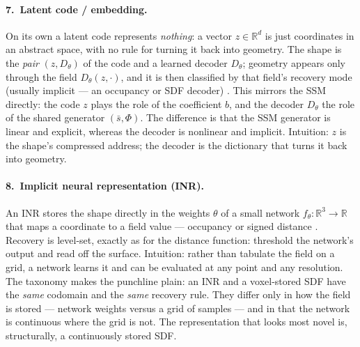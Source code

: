 %
\paragraph{7.~Latent code / embedding.} On its own a latent code represents
\emph{nothing}: a vector $z \in \mathbb{R}^d$ is just coordinates in an abstract space, with
no rule for turning it back into geometry. The shape is the \emph{pair} $(z, D_\theta)$ of
the code and a learned decoder $D_\theta$; geometry appears only through the field
$D_\theta(z, \cdot)$, and it is then classified by that field's recovery mode (usually
implicit --- an occupancy or SDF decoder) \citep{park2019deepsdf, mescheder2019occupancy}.
This mirrors the SSM directly: the code $z$ plays the role of the coefficient $b$, and the
decoder $D_\theta$ the role of the shared generator $(\bar{s}, \Phi)$. The difference is
that the SSM generator is linear and explicit, whereas the decoder is nonlinear and
implicit. Intuition: $z$ is the shape's compressed address; the decoder is the dictionary
that turns it back into geometry.

%
\paragraph{8.~Implicit neural representation (INR).} An INR stores the shape directly in the
weights $\theta$ of a small network $f_\theta : \mathbb{R}^3 \to \mathbb{R}$ that maps a
coordinate to a field value --- occupancy or signed distance
\citep{mescheder2019occupancy, park2019deepsdf, sitzmann2020siren}. Recovery is level-set,
exactly as for the distance function: threshold the network's output and read off the
surface. Intuition: rather than tabulate the field on a grid, a network learns it and can be
evaluated at any point and any resolution. The taxonomy makes the punchline plain: an INR
and a voxel-stored SDF have the \emph{same} codomain and the \emph{same} recovery rule. They
differ only in how the field is stored --- network weights versus a grid of samples --- and
in that the network is continuous where the grid is not. The representation that looks most
novel is, structurally, a continuously stored SDF.

%
